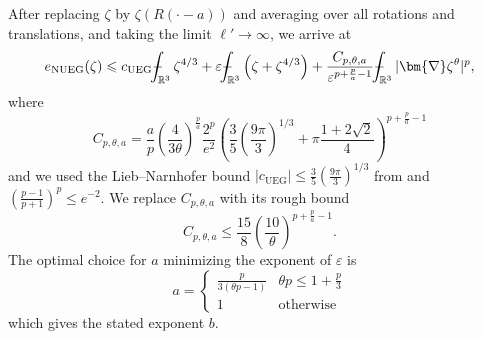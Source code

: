 \documentclass[final,onefignum,onetabnum,reqno]{amsart}
\theoremstyle{remark}
\renewcommand{\le}{\leqslant}
\renewcommand{\epsilon}{\varepsilon}
\newcommand{\RR}{\mathbb{R}}
\newcommand{\UEG}{\mathrm{UEG}} %
\newcommand{\NUEG}{\mathrm{NUEG}} %
\newcommand{\grad}{\bm{\nabla}} %
\def\Xint#1{\mathchoice
{\XXint\displaystyle\textstyle{#1}}%
{\XXint\textstyle\scriptstyle{#1}}%
{\XXint\scriptstyle\scriptscriptstyle{#1}}%
{\XXint\scriptscriptstyle\scriptscriptstyle{#1}}%
\!\int}
\def\XXint#1#2#3{{\setbox0=\hbox{$#1{#2#3}{\int}$ }
\vcenter{\hbox{$#2#3$ }}\kern-.6\wd0}}
\def\dashint{\Xint-}
\begin{document}
After replacing $\zeta$ by $\zeta(R(\cdot-a))$ and averaging over all rotations and translations, and taking the limit $\ell'\to\infty$, we arrive at
$$
e_{\NUEG}(\zeta)\le c_\UEG \dashint_{\RR^3} \zeta^{4/3} + \epsilon \dashint_{\RR^3} \left(\zeta+\zeta^{4/3}\right)
+  \frac{C_{p,\theta,a}}{\epsilon^{p+\frac{p}{a}-1}}  \dashint_{\RR^3} |\grad\zeta^\theta|^p,
$$
where
$$
C_{p,\theta,a}=\frac{a}{p}\left(\frac{4}{3\theta}\right)^{\frac{p}{a}} \frac{2^p}{e^2} \left( \frac{3}{5} \left(\frac{9\pi}{3}\right)^{1/3}+\pi\frac{1+2\sqrt{2}}{4}\right)^{p+\frac{p}{a}-1}
$$
and we used the Lieb--Narnhofer bound $|c_\UEG| \le \frac{3}{5} \left(\frac{9\pi}{3}\right)^{1/3}$ from \cite{lieb1975thermodynamic} and $\left(\frac{p-1}{p+1}\right)^p\le e^{-2}$. 
We replace $C_{p,\theta,a}$ with its rough bound
\begin{equation}\label{Crough}
C_{p,\theta,a}\le \frac{15}{8} \left(\frac{10}{\theta}\right)^{p+\frac{p}{a}-1}.
\end{equation}
The optimal choice for $a$ minimizing the exponent of $\epsilon$ is
$$
a=\begin{cases}
\frac{p}{3(\theta p -1)} & \theta p \le 1 + \frac{p}{3}\\ 
1 & \text{otherwise}
\end{cases}
$$
which gives the stated exponent $b$.
\end{document}
